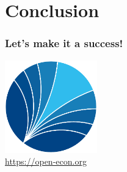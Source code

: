 \section{Conclusion}

\begin{frame}[standout]\frametitle{Let's make it a success!}\vspace{1.5cm}

\hspace{1.5cm}\href{https://open-econ.org}{\includegraphics[height=4cm]{material/ose-logo-no-type-rgb.pdf}}
\\[-2.225cm]
\hspace{6.5cm}\textcolor{OSEBlue}{\fontsize{22pt}{22pt}\selectfont \href{https://open-econ.org}{https://open-econ.org}} 

\end{frame}
